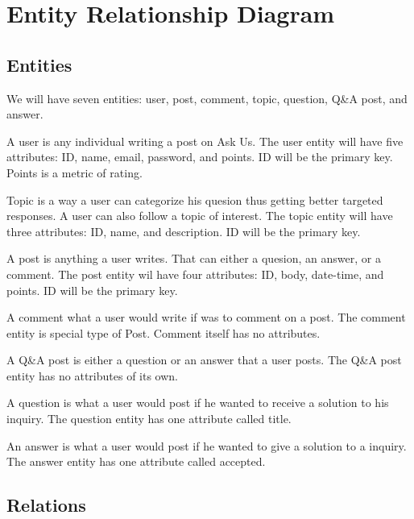 \section{Entity Relationship Diagram}
\subsection{Entities}
We will have seven entities: user, post, comment, topic, question, Q\&A post, and answer.

A user is any individual writing a post on Ask Us. The user entity will have five attributes: ID, name, email, password, and points. ID will be the primary key. Points is a metric of rating.

Topic is a way a user can categorize his quesion thus getting better targeted responses. A user can also follow a topic of interest. The topic entity will have three attributes: ID, name, and description. ID will be the primary key.

A post is anything a user writes. That can either a quesion, an answer, or a comment. The post entity wil have four attributes: ID, body, date-time, and points. ID will be the primary key.

A comment what a user would write if was to comment on a post. The comment entity is special type of Post. Comment itself has no attributes.

A Q\&A post is either a question or an answer that a user posts. The Q\&A post entity has no attributes of its own.

A question is what a user would post if he wanted to receive a solution to his inquiry. The question entity has one attribute called title.

An answer is what a user would post if he wanted to give a solution to a inquiry. The answer entity has one attribute called accepted.

\subsection{Relations}
